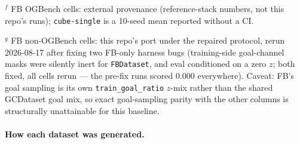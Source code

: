 \documentclass[10pt]{article}
\begin{document}
$^{f}$ FB OGBench cells: external provenance (reference-stack numbers, not this repo's
runs); \texttt{cube-single} is a 10-seed mean reported without a CI.

$^{g}$ FB non-OGBench cells: this repo's port under the repaired protocol, rerun 2026-08-17
after fixing two FB-only harness bugs (training-side goal-channel masks were silently inert
for \texttt{FBDataset}, and eval conditioned on a zero $z$; both fixed, all cells rerun ---
the pre-fix runs scored $0.000$ everywhere). Caveat: FB's goal sampling is its own
\texttt{train\_goal\_ratio} $z$-mix rather than the shared GCDataset goal mix, so exact
goal-sampling parity with the other columns is structurally unattainable for this baseline.

\paragraph{How each dataset was generated.}
\end{document}
